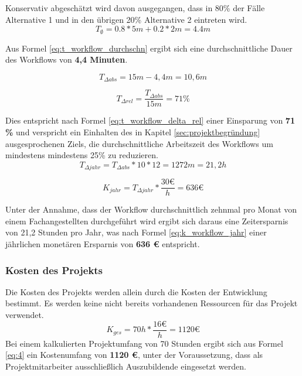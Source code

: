 \documentclass[12pt, xcolor=dvipsnames]{scrartcl}
\begin{document}
Konservativ abgeschätzt wird davon ausgegangen, dass in 80\% der Fälle Alternative 1 und in den übrigen 20\% Alternative 2 eintreten wird.
\begin{equation} \label{eq:t_workflow_durchschn}
	T_\emptyset = 0.8 * 5m + 0.2* 2m = 4.4m
\end{equation}

Aus Formel \ref{eq:t_workflow_durchschn} ergibt sich eine durchschnittliche Dauer des Workflows von \textbf{4,4 Minuten}.


\begin{equation} \label{eq:t_workflow_delta_abs}
	T_{\Delta abs} = 15m-4,4m = 10,6m
\end{equation}

\begin{equation} \label{eq:t_workflow_delta_rel}
	T_{\Delta rel} = \frac{T_{\Delta abs}}{15m} = 71\%
\end{equation}

Dies entspricht nach Formel \ref{eq:t_workflow_delta_rel} einer Einsparung von \textbf{71 \%} und verspricht ein Einhalten des in Kapitel \ref{sec:projektbegründung} ausgesprochenen Ziels, die durchschnittliche Arbeitszeit des Workflows um mindestens mindestens 25\% zu reduzieren. \\

\begin{equation} \label{eq:t_workflow_delta_jahr}
	T_{\Delta jahr} = T_{\Delta abs} * 10 * 12 = 1272m = 21,2h
\end{equation}

\begin{equation} \label{eq:k_workflow_jahr}
	K_{jahr} = T_{\Delta jahr} *  \frac{30 \euro}{h} = 636 \euro
\end{equation}

Unter der Annahme, dass der Workflow durchschnittlich zehnmal pro Monat von einem Fachangestellten durchgeführt wird ergibt sich daraus eine Zeitersparnis von 21,2 Stunden pro Jahr, was nach Formel \ref{eq:k_workflow_jahr} einer jährlichen monetären Ersparnis von \textbf{636 \euro{}} entspricht.


\subsubsection{Kosten des Projekts}
\label{sec:kosten_des_projekts}

Die Kosten des Projekts werden allein durch die Kosten der Entwicklung bestimmt. Es werden keine nicht bereits vorhandenen Ressourcen für das Projekt verwendet.
\begin{equation} \label{eq:4}
	K_{ges} = 70h * \frac{16 \euro}{h} = 1120 \euro
\end{equation}
Bei einem kalkulierten Projektumfang von 70 Stunden ergibt sich aus Formel \ref{eq:4} ein Kostenumfang von \textbf{1120 \euro{}}, unter der Voraussetzung, dass als Projektmitarbeiter ausschließlich Auszubildende eingesetzt werden.
\end{document}
